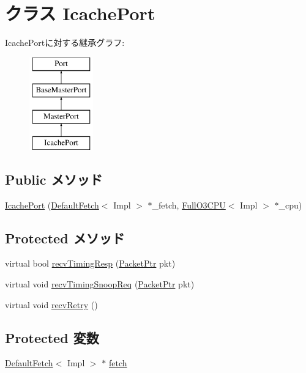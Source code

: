 \hypertarget{classFullO3CPU_1_1IcachePort}{
\section{クラス IcachePort}
\label{classFullO3CPU_1_1IcachePort}
}
IcachePortに対する継承グラフ:\begin{figure}[H]
\begin{center}
\leavevmode
\includegraphics[height=4cm]{classFullO3CPU_1_1IcachePort}
\end{center}
\end{figure}
\subsection*{Public メソッド}
\begin{DoxyCompactItemize}
\item 
\hyperlink{classFullO3CPU_1_1IcachePort_ab905fcd26bb5e01f16795ab04c55f159}{IcachePort} (\hyperlink{classDefaultFetch}{DefaultFetch}$<$ Impl $>$ $\ast$\_\-fetch, \hyperlink{classFullO3CPU}{FullO3CPU}$<$ Impl $>$ $\ast$\_\-cpu)
\end{DoxyCompactItemize}
\subsection*{Protected メソッド}
\begin{DoxyCompactItemize}
\item 
virtual bool \hyperlink{classFullO3CPU_1_1IcachePort_a482dba5588f4bee43e498875a61e5e0b}{recvTimingResp} (\hyperlink{classPacket}{PacketPtr} pkt)
\item 
virtual void \hyperlink{classFullO3CPU_1_1IcachePort_ae43c73eff109f907118829fcfa9e7096}{recvTimingSnoopReq} (\hyperlink{classPacket}{PacketPtr} pkt)
\item 
virtual void \hyperlink{classFullO3CPU_1_1IcachePort_a29cb5a4f98063ce6e9210eacbdb35298}{recvRetry} ()
\end{DoxyCompactItemize}
\subsection*{Protected 変数}
\begin{DoxyCompactItemize}
\item 
\hyperlink{classDefaultFetch}{DefaultFetch}$<$ Impl $>$ $\ast$ \hyperlink{classFullO3CPU_1_1IcachePort_a10f1a41fdcff6e7574a83b020d3c1a91}{fetch}
\end{DoxyCompactItemize}


